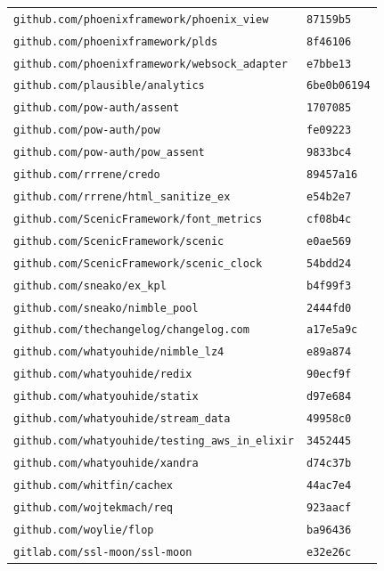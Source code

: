 \begin{longtable}{@{}p{} l@{}}
\texttt{github.com/phoenixframework/phoenix\_view} & \texttt{87159b5} \\
\texttt{github.com/phoenixframework/plds} & \texttt{8f46106} \\
\texttt{github.com/phoenixframework/websock\_adapter} & \texttt{e7bbe13} \\
\texttt{github.com/plausible/analytics} & \texttt{6be0b06194} \\
\texttt{github.com/pow-auth/assent} & \texttt{1707085} \\
\texttt{github.com/pow-auth/pow} & \texttt{fe09223} \\
\texttt{github.com/pow-auth/pow\_assent} & \texttt{9833bc4} \\
\texttt{github.com/rrrene/credo} & \texttt{89457a16} \\
\texttt{github.com/rrrene/html\_sanitize\_ex} & \texttt{e54b2e7} \\
\texttt{github.com/ScenicFramework/font\_metrics} & \texttt{cf08b4c} \\
\texttt{github.com/ScenicFramework/scenic} & \texttt{e0ae569} \\
\texttt{github.com/ScenicFramework/scenic\_clock} & \texttt{54bdd24} \\
\texttt{github.com/sneako/ex\_kpl} & \texttt{b4f99f3} \\
\texttt{github.com/sneako/nimble\_pool} & \texttt{2444fd0} \\
\texttt{github.com/thechangelog/changelog.com} & \texttt{a17e5a9c} \\
\texttt{github.com/whatyouhide/nimble\_lz4} & \texttt{e89a874} \\
\texttt{github.com/whatyouhide/redix} & \texttt{90ecf9f} \\
\texttt{github.com/whatyouhide/statix} & \texttt{d97e684} \\
\texttt{github.com/whatyouhide/stream\_data} & \texttt{49958c0} \\
\texttt{github.com/whatyouhide/testing\_aws\_in\_elixir} & \texttt{3452445} \\
\texttt{github.com/whatyouhide/xandra} & \texttt{d74c37b} \\
\texttt{github.com/whitfin/cachex} & \texttt{44ac7e4} \\
\texttt{github.com/wojtekmach/req} & \texttt{923aacf} \\
\texttt{github.com/woylie/flop} & \texttt{ba96436} \\
\texttt{gitlab.com/ssl-moon/ssl-moon} & \texttt{e32e26c} \\
\end{longtable}
\normalsize
